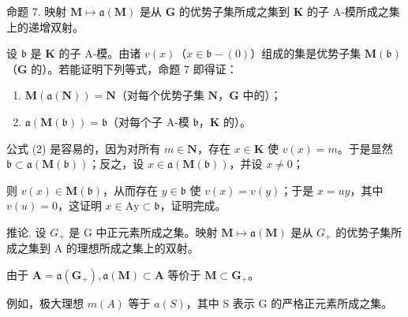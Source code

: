 命题 7. 映射 \(\mathbf{M} \mapsto \mathfrak{a}(\mathbf{M})\) 是从 \(\mathbf{G}\) 的优势子集所成之集到 \(\mathbf{K}\) 的子 A-模所成之集上的递增双射。

设 \(\mathfrak{b}\) 是 \(\mathbf{K}\) 的子 A-模。由诸 \(v(x)\)（\(x \in \mathfrak{b} - (0)\)）组成的集是优势子集 \(\mathbf{M}(\mathfrak{b})\)（\(\mathbf{G}\) 的）。若能证明下列等式，命题 7 即得证：

\begin{enumerate}
\def\labelenumi{(\arabic{enumi})}
\setcounter{enumi}{1}
\item
  \(\mathbf{M}(\mathfrak{a}(\mathbf{N})) = \mathbf{N}\)（对每个优势子集 \(\mathbf{N}\)，\(\mathbf{G}\) 中的）；
\item
  \(\mathfrak{a}(\mathbf{M}(\mathfrak{b})) = \mathfrak{b}\)（对每个子 A-模 \(\mathfrak{b}\)，\(\mathbf{K}\) 的）。
\end{enumerate}

公式 (2) 是容易的，因为对所有 \(m \in \mathbf{N}\)，存在 \(x \in \mathbf{K}\) 使 \(v(x) = m\)。于是显然 \(\mathfrak{b} \subset \mathfrak{a}(\mathbf{M}(\mathfrak{b}))\)；反之，设 \(x \in \mathfrak{a}(\mathbf{M}(\mathfrak{b}))\)，并设 \(x \neq 0\)；

则 \(v(x) \in \mathbf{M}(\mathfrak{b})\)，从而存在 \(y \in \mathfrak{b}\) 使 \(v(x) = v(y)\)；于是 \(x = uy\)，其中 \(v(u) = 0\)，这证明 \(x \in \mathrm{Ay} \subset \mathfrak{b}\)，证明完成。

推论. 设 \(G_{+}\) 是 G 中正元素所成之集。映射 \(\mathbf{M} \mapsto \mathfrak{a}(\mathbf{M})\) 是从 \(G_{+}\) 的优势子集所成之集到 A 的理想所成之集上的双射。

由于 \(\mathbf{A} = \mathfrak{a}(\mathbf{G}_{+}),\mathfrak{a}(\mathbf{M})\subset \mathbf{A}\) 等价于 \(\mathbf{M}\subset \mathbf{G}_{+}\)。

例如，极大理想 \(m(A)\) 等于 \(a(S)\)，其中 S 表示 G 的严格正元素所成之集。
